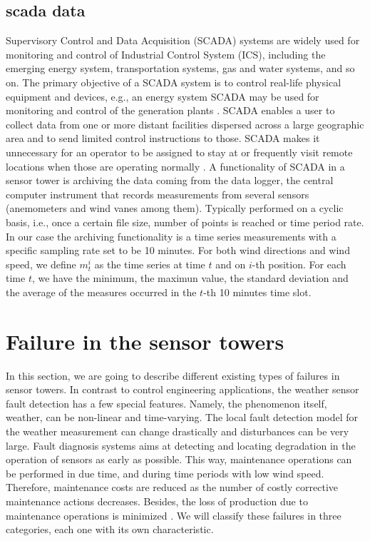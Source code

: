 \documentclass[journal]{IEEEtran}
\begin{document}
\subsection{scada data}\label{subsec:scadaData}
Supervisory Control and Data Acquisition (SCADA) systems are widely used for monitoring and control of Industrial Control System (ICS), including the emerging energy system, transportation systems, gas and water systems, and so on. The primary objective of a SCADA system is to control real-life physical equipment and devices, e.g., an energy system SCADA may be used for monitoring and control of the generation plants \cite{ahmed2015investigation}. SCADA enables a user to collect data from one or more distant facilities dispersed across a large geographic area and to send limited control instructions to those. SCADA makes it unnecessary for an operator to be assigned to stay at or frequently visit remote locations when those are operating normally \cite{boyer2009scada}.
A functionality of SCADA in a sensor tower is archiving the data coming from the data logger, the central computer instrument that records measurements from several sensors (anemometers and wind vanes among them). Typically performed on a cyclic basis, i.e., once a certain file size, number of points is reached or time period rate.  \\
In our case the archiving functionality is a time series measurements with a specific sampling rate set to be 10 minutes.\cite{daneels1999scada}
For both wind directions and wind speed, we define $m_t^i$ as the time series at time $t$ and on $i$-th position. For each time $t$, we have the minimum, the maximun value, the standard deviation and the average of the measures occurred in the $t$-th 10 minutes time slot.


\section{Failure in the sensor towers}\label{sec:failures}
In this section, we are going to describe different existing types of failures in sensor towers. In contrast to control engineering applications, the weather sensor fault detection has a few special features. Namely, the phenomenon itself, weather, can be non-linear and time-varying. The local fault detection model for the weather measurement can change drastically and disturbances can be very large. Fault diagnosis systems aims at detecting and locating degradation in the operation of sensors as early as possible. This way, maintenance operations can be performed in due time, and during time periods with low wind speed. Therefore, maintenance costs are reduced as the number of costly corrective maintenance actions decreases. Besides, the loss of production due to maintenance operations is minimized \cite{luo2014wind}. We will classify these failures in three categories, each one with its own characteristic.
\end{document}
